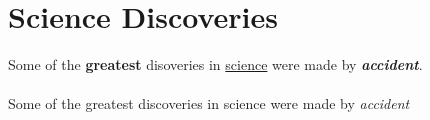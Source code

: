 \documentclass{article}
\begin{document}
	
	\section{Science Discoveries}
	Some of the \textbf{greatest}
	disoveries in \underline{science}
	were made by
	\textbf{\textit{accident}}.
	\paragraph{}
	Some of the greatest discoveries in science were made by \emph{accident}
	
\end{document}
